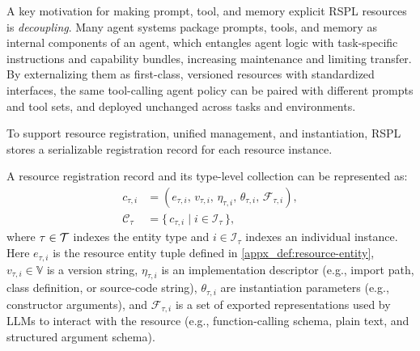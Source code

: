 A key motivation for making prompt, tool, and memory explicit RSPL resources is \emph{decoupling}. Many agent systems package prompts, tools, and memory as internal components of an agent, which entangles agent logic with task-specific instructions and capability bundles, increasing maintenance and limiting transfer. By externalizing them as first-class, versioned resources with standardized interfaces, the same tool-calling agent policy can be paired with different prompts and tool sets, and deployed unchanged across tasks and environments.

To support resource registration, unified management, and instantiation, RSPL stores a serializable registration record for each resource instance.
\begin{definition}
  \label{appx_def:resource-registration-record}
  A resource registration record and its type-level collection can be represented as:
  \begin{equation}
  \begin{aligned}
  c_{\tau,i} &= (e_{\tau,i},\, v_{\tau,i},\, \eta_{\tau,i},\, \theta_{\tau,i},\, \mathcal{F}_{\tau,i}),\\
  \mathcal{C}_{\tau} &= \{\, c_{\tau,i} \mid i \in \mathcal{I}_{\tau} \,\},
  \end{aligned}
  \end{equation}
  where $\tau \in \mathcal{T}$ indexes the entity type and $i \in \mathcal{I}_\tau$ indexes an individual instance. Here $e_{\tau,i}$ is the resource entity tuple defined in \cref{appx_def:resource-entity}, $v_{\tau,i} \in \mathbb{V}$ is a version string, $\eta_{\tau,i}$ is an implementation descriptor (e.g., import path, class definition, or source-code string), $\theta_{\tau,i}$ are instantiation parameters (e.g., constructor arguments), and $\mathcal{F}_{\tau,i}$ is a set of exported representations used by LLMs to interact with the resource (e.g., function-calling schema, plain text, and structured argument schema).
  \end{definition}

